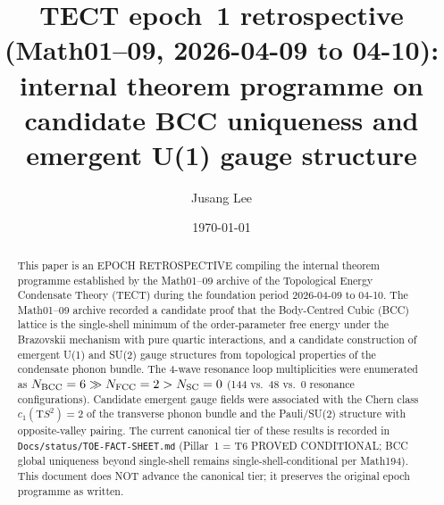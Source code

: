 



\title{TECT epoch~1 retrospective (Math01--09, 2026-04-09 to 04-10):
internal theorem programme on candidate BCC uniqueness and emergent
U(1) gauge structure}

\author{Jusang Lee}

\date{\today}

\begin{abstract}
This paper is an EPOCH RETROSPECTIVE compiling the internal theorem
programme established by the Math01--09 archive of the Topological
Energy Condensate Theory (TECT) during the foundation period
2026-04-09 to 04-10. The Math01--09 archive recorded a candidate proof
that the Body-Centred Cubic (BCC) lattice is the single-shell minimum
of the order-parameter free energy under the Brazovskii mechanism with
pure quartic interactions, and a candidate construction of emergent
U(1) and SU(2) gauge structures from topological properties of the
condensate phonon bundle. The 4-wave resonance loop multiplicities were
enumerated as $N_{\rm BCC} = 6 \gg N_{\rm FCC} = 2 > N_{\rm SC} = 0$
(144 vs.~48 vs.~0 resonance configurations). Candidate emergent gauge
fields were associated with the Chern class
$c_1(\mathrm{T}S^2) = 2$ of the transverse phonon bundle and the
Pauli/SU(2) structure with opposite-valley pairing. The current
canonical tier of these results is recorded in
\texttt{Docs/status/TOE-FACT-SHEET.md} (Pillar~1 = T6 PROVED
CONDITIONAL; BCC global uniqueness beyond single-shell remains
single-shell-conditional per Math194). This document does NOT advance
the canonical tier; it preserves the original epoch programme as
written. \cite{Math01, Math02, Math03, Math04, Math05, Math06,
Math07, Math08, Math09}
\end{abstract}

